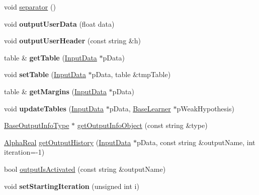 \begin{DoxyCompactItemize}
\item 
void \hyperlink{classMultiBoost_1_1OutputInfo_a215f08683e3d7bdf75c338f564613d7f}{separator} ()
\item 
\hypertarget{classMultiBoost_1_1OutputInfo_afb3deba5970afb8d5ddf44f93abce2ec}{void {\bfseries output\-User\-Data} (float data)}\label{classMultiBoost_1_1OutputInfo_afb3deba5970afb8d5ddf44f93abce2ec}

\item 
\hypertarget{classMultiBoost_1_1OutputInfo_ae10ed27b4a35d03f15f9747eff1f6794}{void {\bfseries output\-User\-Header} (const string \&h)}\label{classMultiBoost_1_1OutputInfo_ae10ed27b4a35d03f15f9747eff1f6794}

\item 
\hypertarget{classMultiBoost_1_1OutputInfo_a9403bd66833a538689d1e0cd6152879e}{table \& {\bfseries get\-Table} (\hyperlink{classMultiBoost_1_1InputData}{Input\-Data} $\ast$p\-Data)}\label{classMultiBoost_1_1OutputInfo_a9403bd66833a538689d1e0cd6152879e}

\item 
\hypertarget{classMultiBoost_1_1OutputInfo_ab3d1c1abc253f07e501b53765bd4292c}{void {\bfseries set\-Table} (\hyperlink{classMultiBoost_1_1InputData}{Input\-Data} $\ast$p\-Data, table \&tmp\-Table)}\label{classMultiBoost_1_1OutputInfo_ab3d1c1abc253f07e501b53765bd4292c}

\item 
\hypertarget{classMultiBoost_1_1OutputInfo_a4ad5ceba66d6212c548ea6d5cd072f50}{table \& {\bfseries get\-Margins} (\hyperlink{classMultiBoost_1_1InputData}{Input\-Data} $\ast$p\-Data)}\label{classMultiBoost_1_1OutputInfo_a4ad5ceba66d6212c548ea6d5cd072f50}

\item 
\hypertarget{classMultiBoost_1_1OutputInfo_af3dca3903e4aae0d0787013568f60ebf}{void {\bfseries update\-Tables} (\hyperlink{classMultiBoost_1_1InputData}{Input\-Data} $\ast$p\-Data, \hyperlink{classMultiBoost_1_1BaseLearner}{Base\-Learner} $\ast$p\-Weak\-Hypothesis)}\label{classMultiBoost_1_1OutputInfo_af3dca3903e4aae0d0787013568f60ebf}

\item 
\hyperlink{classMultiBoost_1_1BaseOutputInfoType}{Base\-Output\-Info\-Type} $\ast$ \hyperlink{classMultiBoost_1_1OutputInfo_a3ca4fbc83b4acb298bb0ac887c22af4f}{get\-Output\-Info\-Object} (const string \&type)
\item 
\hyperlink{Defaults_8h_a80184c4fd10ab70a1a17c5f97dcd1563}{Alpha\-Real} \hyperlink{classMultiBoost_1_1OutputInfo_adbb38b8ab53a523227c756a7fab94866}{get\-Output\-History} (\hyperlink{classMultiBoost_1_1InputData}{Input\-Data} $\ast$p\-Data, const string \&output\-Name, int iteration=-\/1)
\item 
bool \hyperlink{classMultiBoost_1_1OutputInfo_a2b37cd3f75fae8de97ef05401a70798e}{output\-Is\-Activated} (const string \&output\-Name)
\item 
\hypertarget{classMultiBoost_1_1OutputInfo_a25944722d385ef55a8b4aa31e547682f}{void {\bfseries set\-Starting\-Iteration} (unsigned int i)}\label{classMultiBoost_1_1OutputInfo_a25944722d385ef55a8b4aa31e547682f}

\end{DoxyCompactItemize}
